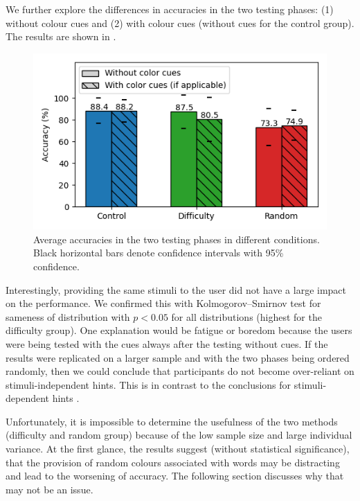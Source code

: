 We further explore the differences in accuracies in the two testing phases: (1) without colour cues and (2) with colour cues (without cues for the control group).
The results are shown in .


\begin{figure}[ht]
\includegraphics[width=\linewidth]{img/phase_acc.png}
\caption{
    Average accuracies in the two testing phases in different conditions.
    Black horizontal bars denote confidence intervals with 95\% confidence.
}
\label{fig:phase_acc}
\end{figure}

Interestingly, providing the same stimuli to the user did not have a large impact on the performance.
We confirmed this with Kolmogorov–Smirnov test \cite{massey1951kolmogorov} for sameness of distribution with $p<0.05$ for all distributions (highest for the difficulty group).
One explanation would be fatigue or boredom because the users were being tested with the cues always after the testing without cues.
If the results were replicated on a larger sample and with the two phases being ordered randomly, then we could conclude that participants do not become over-reliant on stimuli-independent hints.
This is in contrast to the conclusions for stimuli-dependent hints \cite{van2019effects}.

Unfortunately, it is impossible to determine the usefulness of the two methods (difficulty and random group) because of the low sample size and large individual variance.
At the first glance, the results suggest (without statistical significance), that the provision of random colours associated with words may be distracting and lead to the worsening of accuracy.
The following section discusses why that may not be an issue.

